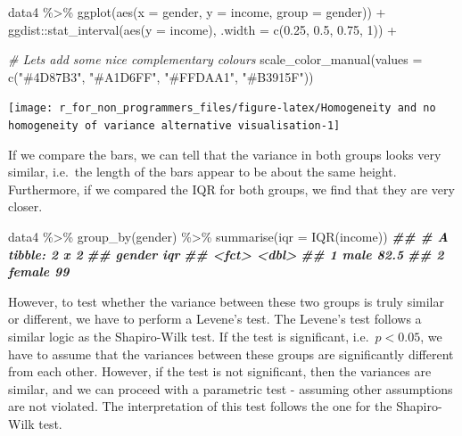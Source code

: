 \documentclass[
]{book}
\newenvironment{Shaded}{\begin{snugshade}}{\end{snugshade}}
\newcommand{\AttributeTok}[1]{\textcolor[rgb]{0.77,0.63,0.00}{#1}}
\newcommand{\CommentTok}[1]{\textcolor[rgb]{0.56,0.35,0.01}{\textit{#1}}}
\newcommand{\DecValTok}[1]{\textcolor[rgb]{0.00,0.00,0.81}{#1}}
\newcommand{\DocumentationTok}[1]{\textcolor[rgb]{0.56,0.35,0.01}{\textbf{\textit{#1}}}}
\newcommand{\FloatTok}[1]{\textcolor[rgb]{0.00,0.00,0.81}{#1}}
\newcommand{\FunctionTok}[1]{\textcolor[rgb]{0.00,0.00,0.00}{#1}}
\newcommand{\NormalTok}[1]{#1}
\newcommand{\SpecialCharTok}[1]{\textcolor[rgb]{0.00,0.00,0.00}{#1}}
\newcommand{\StringTok}[1]{\textcolor[rgb]{0.31,0.60,0.02}{#1}}
\begin{document}
\begin{Shaded}
\begin{Highlighting}[]
\NormalTok{data4 }\SpecialCharTok{\%\textgreater{}\%} 
  \FunctionTok{ggplot}\NormalTok{(}\FunctionTok{aes}\NormalTok{(}\AttributeTok{x =}\NormalTok{ gender, }\AttributeTok{y =}\NormalTok{ income, }\AttributeTok{group =}\NormalTok{ gender)) }\SpecialCharTok{+}
\NormalTok{  ggdist}\SpecialCharTok{::}\FunctionTok{stat\_interval}\NormalTok{(}\FunctionTok{aes}\NormalTok{(}\AttributeTok{y =}\NormalTok{ income),}
                        \AttributeTok{.width =} \FunctionTok{c}\NormalTok{(}\FloatTok{0.25}\NormalTok{, }\FloatTok{0.5}\NormalTok{, }\FloatTok{0.75}\NormalTok{, }\DecValTok{1}\NormalTok{)) }\SpecialCharTok{+}
  
  \CommentTok{\# Let\textquotesingle{}s add some nice complementary colours}
  \FunctionTok{scale\_color\_manual}\NormalTok{(}\AttributeTok{values =} \FunctionTok{c}\NormalTok{(}\StringTok{"\#4D87B3"}\NormalTok{, }\StringTok{"\#A1D6FF"}\NormalTok{, }\StringTok{"\#FFDAA1"}\NormalTok{, }\StringTok{"\#B3915F"}\NormalTok{))}
\end{Highlighting}
\end{Shaded}

\begin{center}\texttt{[image: r\_for\_non\_programmers\_files/figure-latex/Homogeneity and no homogeneity of variance alternative visualisation-1]} \end{center}

If we compare the bars, we can tell that the variance in both groups looks very similar, i.e.~the length of the bars appear to be about the same height. Furthermore, if we compared the IQR for both groups, we find that they are very closer.

\begin{Shaded}
\begin{Highlighting}[]
\NormalTok{data4 }\SpecialCharTok{\%\textgreater{}\%} 
  \FunctionTok{group\_by}\NormalTok{(gender) }\SpecialCharTok{\%\textgreater{}\%} 
  \FunctionTok{summarise}\NormalTok{(}\AttributeTok{iqr =} \FunctionTok{IQR}\NormalTok{(income))}
\DocumentationTok{\#\# \# A tibble: 2 x 2}
\DocumentationTok{\#\#   gender   iqr}
\DocumentationTok{\#\#   \textless{}fct\textgreater{}  \textless{}dbl\textgreater{}}
\DocumentationTok{\#\# 1 male    82.5}
\DocumentationTok{\#\# 2 female  99}
\end{Highlighting}
\end{Shaded}

However, to test whether the variance between these two groups is truly similar or different, we have to perform a Levene's test. The Levene's test follows a similar logic as the Shapiro-Wilk test. If the test is significant, i.e.~\(p < 0.05\), we have to assume that the variances between these groups are significantly different from each other. However, if the test is not significant, then the variances are similar, and we can proceed with a parametric test - assuming other assumptions are not violated. The interpretation of this test follows the one for the Shapiro-Wilk test.
\end{document}
